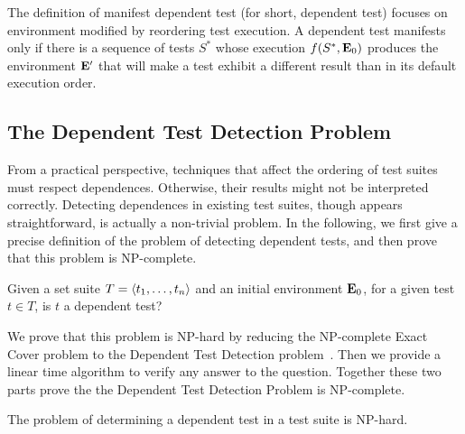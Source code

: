 
The definition of manifest dependent test (for short, dependent test)
focuses on environment modified by reordering test execution.
A dependent test manifests only
if there is a sequence of tests $S^*$ whose execution
$f(S^*,\mathbf{E}_0)$  produces the
environment $\mathbf{E}'$ that will make a test exhibit a
different result than in its default execution order.


\subsection{The Dependent Test Detection Problem}

From a practical perspective, techniques that affect the ordering of
test suites must respect dependences. Otherwise, their results might
not be interpreted correctly. Detecting
dependences in existing test suites, though appears straightforward,
is actually a non-trivial problem.
In the following, we first give a precise definition of the problem of
detecting dependent tests, and then prove that this problem
is NP-complete. 


\begin{definition}
Given a set suite\/ $T =  \langle t_1, \dots, t_n \rangle $ and an initial environment\/
$\mathbf{E}_0$, for a given test\/ $t \in T$, is $t$ a dependent test?
\end{definition}

We prove that this problem is NP-hard by reducing the NP-complete Exact Cover problem
to the Dependent Test Detection
problem~\cite{karp:NP:1972}. 
Then we provide a linear time algorithm to verify any answer to the
question.
Together these two parts prove the the Dependent Test Detection Problem is NP-complete.

\begin{theorem}
The problem of determining a dependent test in
a test suite is NP-hard.
\end{theorem}

